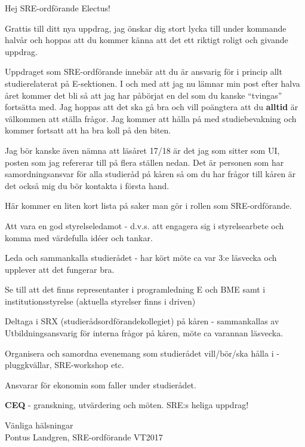 \documentclass[10pt]{article}
\begin{document}
\heading{\doctitle}

Hej SRE-ordförande Electus!

Grattis till ditt nya uppdrag, jag önskar dig stort lycka till under kommande halvår och hoppas att du kommer känna att det ett riktigt roligt och givande uppdrag.

Uppdraget som SRE-ordförande innebär att du är ansvarig för i princip allt studierelaterat på E-sektionen. I och med att jag nu lämnar min post efter halva året kommer det bli så att jag har påbörjat en del som du kanske ``tvingas'' fortsätta med. Jag hoppas att det ska gå bra och vill poängtera att du \textbf{alltid} är välkommen att ställa frågor. Jag kommer att hålla på med studiebevakning och kommer fortsatt att ha bra koll på den biten.

Jag bör kanske även nämna att läsåret 17/18 är det jag som sitter som UI, posten som jag refererar till på flera ställen nedan. Det är personen som har samordningsansvar för alla studieråd på kåren så om du har frågor till kåren är det också mig du bör kontakta i första hand.

Här kommer en liten kort lista på saker man gör i rollen som SRE-ordförande.
\begin{dashlist}
    \item Att vara en god styrelseledamot - d.v.s. att engagera sig i styrelsearbete och komma med värdefulla idéer och tankar.
    \item Leda och sammankalla studierådet - har kört möte ca var 3:e läsvecka och upplever att det fungerar bra.
    \item Se till att det finns representanter i programledning E och BME samt i institutionsstyrelse (aktuella styrelser finns i driven)
    \item Deltaga i SRX (studierådsordförandekollegiet) på kåren - sammankallas av Utbildningsansvarig för interna frågor på kåren, möte ca varannan läsvecka.
    \item Organisera och samordna evenemang som studierådet vill/bör/ska hålla i - pluggkvällar, SRE-workshop etc.
    \item Ansvarar för ekonomin som faller under studierådet.
    \item \textbf{CEQ} - granskning, utvärdering och möten. SRE:s heliga uppdrag! 
   
\end{dashlist}



\begin{itshape}
Vänliga hälsningar\\
Pontus Landgren, SRE-ordförande VT2017\\
\end{itshape}
\end{document}

